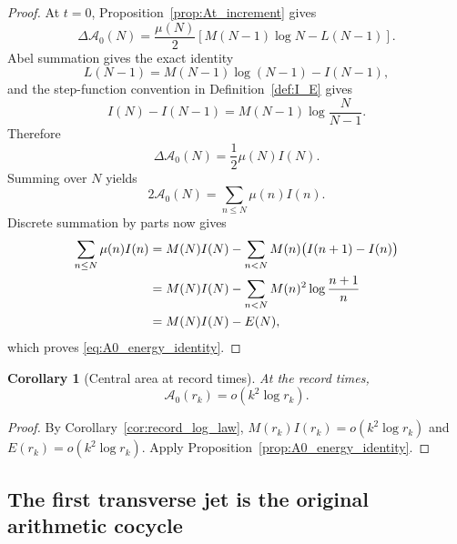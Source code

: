 \documentclass[11pt]{amsart}
\numberwithin{equation}{section}
\theoremstyle{plain}
\newtheorem{corollary}[theorem]{Corollary}
\theoremstyle{definition}
\theoremstyle{remark}
\begin{document}
\begin{proof}
At \(t=0\), Proposition~\ref{prop:At_increment} gives
\begin{equation}
\Delta\mathcal A_0(N)
=
\frac{\mu(N)}2
\left[M(N-1)\log N-L(N-1)\right].
\label{eq:A0_increment_first}
\end{equation}
Abel summation gives the exact identity
\begin{equation}
L(N-1)=M(N-1)\log(N-1)-I(N-1),
\label{eq:L_Abel_Nminus1}
\end{equation}
and the step-function convention in Definition~\ref{def:I_E} gives
\begin{equation}
I(N)-I(N-1)=M(N-1)\log\frac{N}{N-1}.
\label{eq:I_increment}
\end{equation}
Therefore
\begin{equation}
\Delta\mathcal A_0(N)=\frac12\mu(N)I(N).
\label{eq:A0_increment_I}
\end{equation}
Summing over \(N\) yields
\begin{equation}
2\mathcal A_0(N)=\sum_{n\le N}\mu(n)I(n).
\label{eq:A0_sum_muI}
\end{equation}
Discrete summation by parts now gives
\begin{align}
\sum_{n\le N}\mu(n)I(n)
&=M(N)I(N)
-\sum_{n<N}M(n)\bigl(I(n+1)-I(n)\bigr)
\notag\\
&=M(N)I(N)
-\sum_{n<N}M(n)^2\log\frac{n+1}{n}
\notag\\
&=M(N)I(N)-E(N),
\label{eq:muI_summation_by_parts}
\end{align}
which proves \eqref{eq:A0_energy_identity}.
\end{proof}

\begin{corollary}[Central area at record times]
\label{cor:A0_record_small}
At the record times,
\begin{equation}
\boxed{\mathcal A_0(r_k)=o(k^2\log r_k).}
\label{eq:A0_record_small}
\end{equation}
\end{corollary}

\begin{proof}
By Corollary~\ref{cor:record_log_law},
\(M(r_k)I(r_k)=o(k^2\log r_k)\) and
\(E(r_k)=o(k^2\log r_k)\).  Apply
Proposition~\ref{prop:A0_energy_identity}.
\end{proof}

\subsection{The first transverse jet is the original arithmetic cocycle}
\label{subsec:first_jet_cocycle}
\end{document}
